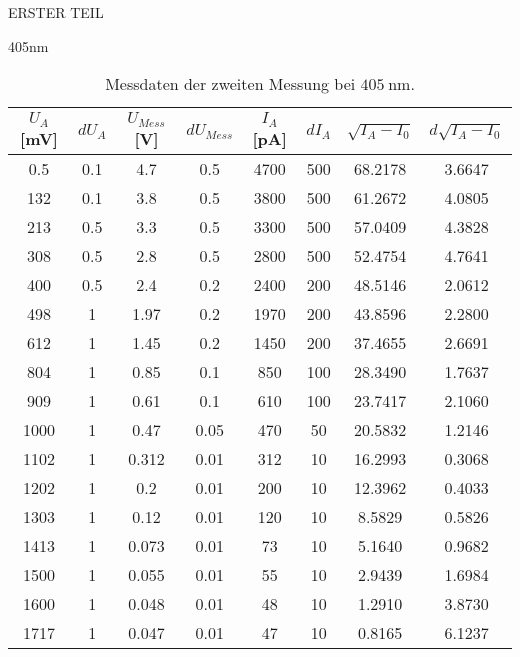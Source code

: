 \begin{appendix}
\begin{chapter}{ERSTER TEIL}
\begin{section}{405nm}
        \begin{table}[htbp]
          \centering
          \scriptsize
          \begin{tabular}{|c|c|c|c|c|c|c|c|}
            \hline
            $U_{A}$ [mV] & $dU_{A}$ & $U_{Mess}$ [V] & $dU_{Mess}$ & 
                $I_{A}$ [pA] & $dI_{A}$ & $\sqrt{I_{A}-I_0}$ & 
                $d\sqrt{I_{A}-I_0}$ \\ \hline
            0.5 & 0.1 & 4.7 & 0.5 & 4700 & 500 & 68.2178 & 3.6647 \\ \hline
            132 & 0.1 & 3.8 & 0.5 & 3800 & 500 & 61.2672 & 4.0805 \\ \hline
            213 & 0.5 & 3.3 & 0.5 & 3300 & 500 & 57.0409 & 4.3828 \\ \hline
            308 & 0.5 & 2.8 & 0.5 & 2800 & 500 & 52.4754 & 4.7641 \\ \hline
            400 & 0.5 & 2.4 & 0.2 & 2400 & 200 & 48.5146 & 2.0612 \\ \hline
            498 & 1 & 1.97 & 0.2 & 1970 & 200 & 43.8596 & 2.2800 \\ \hline
            612 & 1 & 1.45 & 0.2 & 1450 & 200 & 37.4655 & 2.6691 \\ \hline
            804 & 1 & 0.85 & 0.1 & 850 & 100 & 28.3490 & 1.7637 \\ \hline
            909 & 1 & 0.61 & 0.1 & 610 & 100 & 23.7417 & 2.1060 \\ \hline
            1000 & 1 & 0.47 & 0.05 & 470 & 50 & 20.5832 & 1.2146 \\ \hline
            1102 & 1 & 0.312 & 0.01 & 312 & 10 & 16.2993 & 0.3068 \\ \hline
            1202 & 1 & 0.2 & 0.01 & 200 & 10 & 12.3962 & 0.4033 \\ \hline
            1303 & 1 & 0.12 & 0.01 & 120 & 10 & 8.5829 & 0.5826 \\ \hline
            1413 & 1 & 0.073 & 0.01 & 73 & 10 & 5.1640 & 0.9682 \\ \hline
            1500 & 1 & 0.055 & 0.01 & 55 & 10 & 2.9439 & 1.6984 \\ \hline
            1600 & 1 & 0.048 & 0.01 & 48 & 10 & 1.2910 & 3.8730 \\ \hline
            1717 & 1 & 0.047 & 0.01 & 47 & 10 & 0.8165 & 6.1237 \\ \hline
          \end{tabular}
          \caption{Messdaten der zweiten Messung bei $\SI{405}{\nano\meter}$.}
          \label{tab:405_2}
        \end{table}
        

\end{section}
\end{chapter}
\end{appendix}
